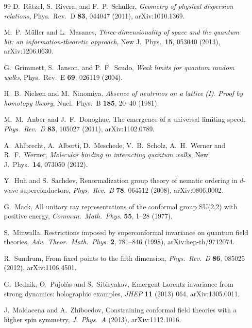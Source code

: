 \documentclass[12pt]{article}
\theoremstyle{definition}
\theoremstyle{remark}
\begin{document}
\begin{thebibliography}{99}
D.~R\"atzel, S.~Rivera, and F.~P.~Schuller, \emph{Geometry of physical dispersion relations}, Phys.\ Rev.\ D \textbf{83}, 044047 (2011), arXiv:1010.1369.

M.~P.~M\"uller and L.~Masanes, \emph{Three-dimensionality of space and the quantum bit: an information-theoretic approach}, New J.\ Phys.\ \textbf{15}, 053040 (2013), arXiv:1206.0630.

G.~Grimmett, S.~Janson, and P.~F.~Scudo, \emph{Weak limits for quantum random walks}, Phys.\ Rev.\ E \textbf{69}, 026119 (2004).

H.~B.~Nielsen and M.~Ninomiya, \emph{Absence of neutrinos on a lattice (I). Proof by homotopy theory}, Nucl.\ Phys.\ B \textbf{185}, 20--40 (1981).

M.~M.~Anber and J.~F.~Donoghue, The emergence of a universal limiting speed, \emph{Phys.\ Rev.\ D} \textbf{83}, 105027 (2011), arXiv:1102.0789.

A.~Ahlbrecht, A.~Alberti, D.~Meschede, V.~B.~Scholz, A.~H.~Werner and R.~F.~Werner,
\emph{Molecular binding in interacting quantum walks}, New J.\ Phys.\ \textbf{14}, 073050 (2012).

Y.~Huh and S.~Sachdev, Renormalization group theory of nematic ordering in $d$-wave superconductors, \emph{Phys.\ Rev.\ B} \textbf{78}, 064512 (2008), arXiv:0806.0002.

G.~Mack, All unitary ray representations of the conformal group SU(2,2) with positive energy, \emph{Commun.\ Math.\ Phys.} \textbf{55}, 1--28 (1977).

S.~Minwalla, Restrictions imposed by superconformal invariance on quantum field theories, \emph{Adv.\ Theor.\ Math.\ Phys.} \textbf{2}, 781--846 (1998), arXiv:hep-th/9712074.

R.~Sundrum, From fixed points to the fifth dimension, \emph{Phys.\ Rev.\ D} \textbf{86}, 085025 (2012), arXiv:1106.4501.

G.~Bednik, O.~Pujol\`as and S.~Sibiryakov, Emergent Lorentz invariance from strong dynamics: holographic examples, \emph{JHEP} \textbf{11} (2013) 064, arXiv:1305.0011.

J.~Maldacena and A.~Zhiboedov, Constraining conformal field theories with a higher spin symmetry, \emph{J.\ Phys.\ A} (2013), arXiv:1112.1016.


\end{thebibliography}
\end{document}
